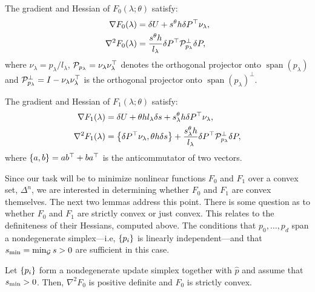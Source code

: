 \documentclass[sisc-eikonal.tex]{subfiles}
\begin{document}
\begin{lemma}\label{lemma:F0-grad-and-Hess}
  The gradient and Hessian of $F_0(\lambda; \theta)$ satisfy:
  \begin{align}
    \nabla F_0(\lambda) &= \delta U + s^{\theta} h \delta P^\top \nu_\lambda,\label{eq:F0-grad} \\
    \nabla^2 F_0(\lambda) &= \frac{s^{\theta} h}{l_\lambda} \delta P^\top \calP^\perp_{p_\lambda} \delta P,
  \end{align}
  where $\nu_\lambda = p_\lambda/l_\lambda$,
  $\mathcal{P}_{p_\lambda} = \nu_\lambda \nu_\lambda^\top$ denotes the
  orthogonal projector onto $\operatorname{span}(p_\lambda)$ and
  $\mathcal{P}_{p_\lambda}^\perp = I - \nu_\lambda \nu_\lambda^\top$ is the
  orthogonal projector onto $\operatorname{span}(p_\lambda)^\perp$.
\end{lemma}

\begin{lemma}\label{lemma:F1-grad-and-Hess}
  The gradient and Hessian of $F_1(\lambda; \theta)$ satisfy:
  \begin{align}
    \nabla F_1(\lambda) &= \delta U + \theta h l_\lambda \delta s + s^{\theta}_\lambda h \delta P^\top \nu_\lambda, \\
    \nabla^2 F_1(\lambda) &= \set{\delta P^\top \nu_\lambda, \theta h \delta s} + \frac{s^\theta_\lambda h}{l_\lambda} \delta P^\top \calP^\perp_{p_\lambda} \delta P, \label{eq:hess-F1}
  \end{align}
  where $\left\{a, b\right\} = ab^\top + ba^\top$ is the anticommutator of two
  vectors.
\end{lemma}

Since our task will be to minimize nonlinear functions $F_0$ and $F_1$
over a convex set, $\Delta^n$, we are interested in determining
whether $F_0$ and $F_1$ are convex themselves. The next two lemmas
address this point. There is some question as to whether $F_0$ and
$F_1$ are strictly convex or just convex. This relates to the
definiteness of their Hessians, computed above. The conditions that
$p_0, \hdots, p_d$ span a nondegenerate simplex---i.e, $\left\{p_i\right\}$ is
linearly independent---and that $s_{\operatorname{min}} = \min_{\mathcal{G}} s > 0$ are
sufficient in this case.

\begin{lemma}\label{lemma:dPt-cprojp-dP-pd}
  Let $\left\{p_i\right\}$ form a nondegenerate update simplex together with
  $\hat{p}$ and assume that $s_{\operatorname{min}} > 0$. Then, $\nabla^2 F_0$ is
  positive definite and $F_0$ is strictly convex.
\end{lemma}
\end{document}
